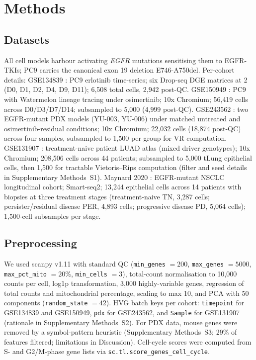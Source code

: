 \section{Methods}

\subsection*{Datasets}

All cell models harbour activating \emph{EGFR} mutations sensitising
them to EGFR-TKIs; PC9 carries the canonical exon 19 deletion
E746-A750del. Per-cohort details:
GSE134839 \citep{aissa2021}: PC9 erlotinib time-series; six Drop-seq
DGE matrices at \SI{2}{\micro\molar} (D0, D1, D2, D4, D9, D11);
6{,}508 total cells, 2{,}942 post-QC.
GSE150949 \citep{oren2021}: PC9 with Watermelon lineage tracing under
osimertinib; 10x Chromium; 56{,}419 cells across D0/D3/D7/D14;
subsampled to 5{,}000 (4{,}999 post-QC).
GSE243562 \citep{wurtz2024}: two EGFR-mutant PDX models (YU-003,
YU-006) under matched untreated and osimertinib-residual conditions;
10x Chromium; 22{,}032 cells (18{,}874 post-QC) across four samples,
subsampled to 1{,}500 per group for VR computation.
GSE131907 \citep{kim2020}: treatment-naive patient LUAD atlas (mixed
driver genotypes); 10x Chromium; 208{,}506 cells across 44 patients;
subsampled to 5{,}000 tLung epithelial cells, then 1{,}500 for
tractable Vietoris--Rips computation (filter and seed details in
Supplementary Methods~S1).
Maynard 2020 \citep{maynard2020}: EGFR-mutant NSCLC longitudinal
cohort; Smart-seq2; 13{,}244 epithelial cells across 14 patients with
biopsies at three treatment stages (treatment-naive TN, 3{,}287
cells; persister/residual disease PER, 4{,}893 cells; progressive
disease PD, 5{,}064 cells); 1{,}500-cell subsamples per stage.

\subsection*{Preprocessing}

We used scanpy v1.11 \citep{wolf2018} with standard QC
(\texttt{min\_genes} $= 200$, \texttt{max\_genes} $= 5000$,
\texttt{max\_pct\_mito} $= 20\%$, \texttt{min\_cells} $= 3$),
total-count normalisation to 10{,}000 counts per cell, log1p
transformation, 3{,}000 highly-variable genes, regression of total
counts and mitochondrial percentage, scaling to max 10, and PCA with
50 components (\texttt{random\_state} $= 42$). HVG batch keys per
cohort: \texttt{timepoint} for GSE134839 and GSE150949,
\texttt{pdx} for GSE243562, and \texttt{Sample} for GSE131907
(rationale in Supplementary Methods~S2). For PDX data, mouse genes were removed
by a symbol-pattern heuristic (Supplementary Methods~S3; 29\% of
features filtered; limitations in Discussion). Cell-cycle scores were
computed from \citet{tirosh2016} S- and G2/M-phase gene lists via
\texttt{sc.tl.score\_genes\_cell\_cycle}.

